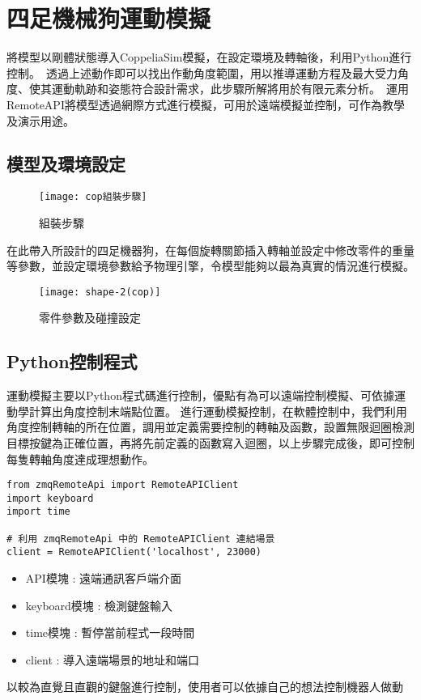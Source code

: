 \chapter{四足機械狗運動模擬}
將模型以剛體狀態導入CoppeliaSim模擬，在設定環境及轉軸後，利用Python進行控制。\
透過上述動作即可以找出作動角度範圍，用以推導運動方程及最大受力角度、使其運動軌跡和姿態符合設計需求，此步驟所解將用於有限元素分析。\
運用RemoteAPI將模型透過網際方式進行模擬，可用於遠端模擬並控制，可作為教學及演示用途。\\

\section{模型及環境設定}
\begin{figure}[hbt!]
\center
\texttt{[image: cop組裝步驟]}
\caption{\Large 組裝步驟}\label{cop組裝步驟}
\end{figure}
在此帶入所設計的四足機器狗，在每個旋轉關節插入轉軸並設定中修改零件的重量等參數，並設定環境參數給予物理引擎，令模型能夠以最為真實的情況進行模擬。\\

\begin{figure}[hbt!]
\center
\texttt{[image: shape-2(cop)]}
\caption{\Large 零件參數及碰撞設定}\label{shape-2(cop)}
\end{figure}


\section{Python控制程式}
運動模擬主要以Python程式碼進行控制，優點有為可以遠端控制模擬、可依據運動學計算出角度控制末端點位置。
進行運動模擬控制，在軟體控制中，我們利用角度控制轉軸的所在位置，調用並定義需要控制的轉軸及函數，設置無限迴圈檢測目標按鍵為正確位置，再將先前定義的函數寫入迴圈，以上步驟完成後，即可控制每隻轉軸角度達成理想動作。\\


\label{模塊導入}
\begin{lstlisting}[caption=\Large 模塊導入]
from zmqRemoteApi import RemoteAPIClient 
import keyboard
import time

# 利用 zmqRemoteApi 中的 RemoteAPIClient 連結場景
client = RemoteAPIClient('localhost', 23000)
\end{lstlisting}

\begin{itemize}
\item API模塊 : 遠端通訊客戶端介面
\item keyboard模塊 : 檢測鍵盤輸入
\item time模塊 : 暫停當前程式一段時間
\item client : 導入遠端場景的地址和端口
\end{itemize}
以較為直覺且直觀的鍵盤進行控制，使用者可以依據自己的想法控制機器人做動




